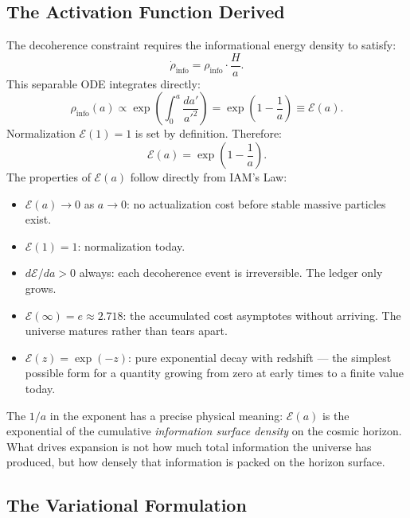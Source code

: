 \documentclass[12pt,a4paper]{article}
\begin{document}
\subsection{The Activation Function Derived}

The decoherence constraint requires the informational energy density
to satisfy:
\begin{equation}
\dot{\rho}_\mathrm{info} = \rho_\mathrm{info}\cdot\frac{H}{a}.
\label{eq:rhodot}
\end{equation}
This separable ODE integrates directly:
\begin{equation}
\rho_\mathrm{info}(a) \propto
\exp\!\left(\int_0^a \frac{da'}{a'^2}\right)
= \exp\!\left(1 - \frac{1}{a}\right) \equiv \mathcal{E}(a).
\label{eq:Ea_derived}
\end{equation}
Normalization $\mathcal{E}(1) = 1$ is set by definition. Therefore:
\begin{equation}
\boxed{\mathcal{E}(a) = \exp\!\left(1 - \frac{1}{a}\right).}
\label{eq:Ea}
\end{equation}
The properties of $\mathcal{E}(a)$ follow directly from IAM's Law:
\begin{itemize}
\item $\mathcal{E}(a) \to 0$ as $a \to 0$: no actualization cost
  before stable massive particles exist.
\item $\mathcal{E}(1) = 1$: normalization today.
\item $d\mathcal{E}/da > 0$ always: each decoherence event is
  irreversible. The ledger only grows.
\item $\mathcal{E}(\infty) = e \approx 2.718$: the accumulated
  cost asymptotes without arriving. The universe matures rather
  than tears apart.
\item $\mathcal{E}(z) = \exp(-z)$: pure exponential decay with
  redshift --- the simplest possible form for a quantity growing
  from zero at early times to a finite value today.
\end{itemize}

The $1/a$ in the exponent has a precise physical meaning:
$\mathcal{E}(a)$ is the exponential of the cumulative
\textit{information surface density} on the cosmic horizon. What
drives expansion is not how much total information the universe has
produced, but how densely that information is packed on the horizon
surface.

\subsection{The Variational Formulation}
\end{document}
